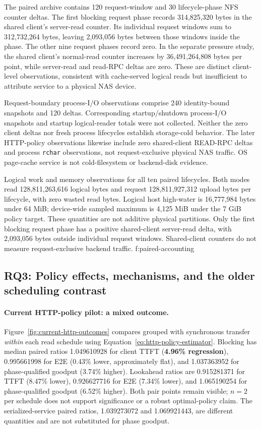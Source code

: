The paired archive contains 120 request-window and 30 lifecycle-phase NFS
counter deltas. The first blocking request phase records 314,825,320 bytes
in the shared client's server-read counter. Its individual request windows
sum to 312,732,264 bytes, leaving 2,093,056 bytes between those windows inside
the phase. The other nine request phases record zero. In the separate
pressure study, the shared client's normal-read counter increases by
36,491,264,808 bytes per point, while server-read and read-RPC deltas are zero.
These are distinct client-level observations, consistent with cache-served
logical reads but insufficient to attribute service to a physical NAS device.

Request-boundary process-I/O observations comprise 240 identity-bound
snapshots and 120 deltas. Corresponding startup/shutdown process-I/O snapshots
and startup logical-reader totals were not collected. Neither the zero client
deltas nor fresh process lifecycles establish storage-cold behavior. The later
HTTP-policy observations likewise include zero shared-client READ-RPC deltas
and process \texttt{rchar} observations, not request-exclusive physical NAS
traffic. OS page-cache service is not cold-filesystem or backend-disk evidence.

{Logical work and memory observations for all ten paired lifecycles. Both
modes read 128,811,263,616 logical bytes and request 128,811,927,312 upload
bytes per lifecycle, with zero wasted read bytes. Logical host high-water is
16,777,984 bytes under 64 MiB; device-wide sampled maximum is 4,125 MiB under
the 7 GiB policy target. These quantities are not additive physical partitions.
Only the first blocking request phase has a positive shared-client server-read
delta, with 2,093,056 bytes outside individual request windows. Shared-client
counters do not measure request-exclusive backend traffic.}
{f:paired-accounting}

\subsection{RQ3: Policy effects, mechanisms, and the older scheduling contrast}
\label{sec:rq3}
\paragraph{Current HTTP-policy pilot: a mixed outcome.}
Figure~\ref{fig:current-http-outcomes} compares grouped with synchronous
transfer \emph{within} each read schedule using
Equation~\ref{eq:http-policy-estimator}. Blocking has median paired ratios
1.049610928 for client TTFT (\textbf{4.96\% regression}), 0.995661998 for
E2E (0.43\% lower, approximately flat), and 1.037363952 for phase-qualified
goodput (3.74\% higher). Lookahead ratios are 0.915281371 for TTFT (8.47\%
lower), 0.926627716 for E2E (7.34\% lower), and 1.065190254 for
phase-qualified goodput (6.52\% higher). Both pair points remain visible;
$n=2$ per schedule does not support significance or a robust optimal-policy
claim. The serialized-service paired ratios, 1.039273072 and 1.069921443,
are different quantities and are not substituted for phase goodput.

